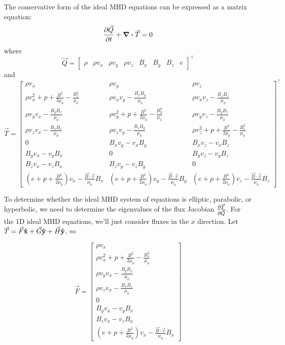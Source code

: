 \documentclass[%
 reprint,
 amsmath,amssymb,
 aps,
]{revtex4-2}
\begin{document}
The conservative form of the ideal MHD equations can be expressed as a matrix equation:
\begin{equation}
\pdv{\vec Q}{t} + \div \vec{T} = 0
\end{equation}
where
\begin{equation}
\vec Q = \begin{bmatrix}
\rho &
\rho v_x &
\rho v_y &
\rho v_z &
B_x &
B_y &
B_z &
e
\end{bmatrix}^\top
\end{equation}
and
\begin{equation}
\vec T = \begin{bmatrix}
\rho v_x & \rho v_y & \rho v_z \\
\rho v_x^2 + p + \frac{B^2}{2 \mu_0} - \frac{B_x ^2}{\mu_0} & \rho v_x v_y - \frac{B_x B_y}{\mu_0} & \rho v_x v_z - \frac{B_x B_z}{\mu_0} \\
\rho v_y v_x - \frac{B_y B_x}{\mu_0} & \rho v_y ^2 + p + \frac{B^2}{2 \mu_0} - \frac{B_y ^2}{\mu_0} & \rho v_y v_z - \frac{B_y B_z}{\mu_0} \\
\rho v_z v_x - \frac{B_x B_z}{\mu_0} & \rho v_z v_y - \frac{B_z B_y}{\mu_0} & \rho v_z ^2 + p + \frac{B^2}{2 \mu_0} - \frac{B_z ^2}{\mu_0} \\
0 & B_x v_y - v_x B_y & B_x v_z - v_x B_z  \\
B_y v_x - v_y B_x  & 0 & B_y v_z - v_y B_z  \\
B_z v_x - v_z B_x & B_z v_y - v_z B_y & 0 \\
\left( e + p + \frac{B^2}{2 \mu_0} \right) v_x - \frac{\vec B \cdot \vec v}{\mu_0} B_x & \left( e + p + \frac{B^2}{2 \mu_0} \right) v_y - \frac{\vec B \cdot \vec v}{\mu_0} B_y & \left( e + p + \frac{B^2}{2 \mu_0} \right) v_z - \frac{\vec B \cdot \vec v}{\mu_0} B_z
\end{bmatrix} ^ \top
\end{equation}

To determine whether the ideal MHD system of equations is elliptic, parabolic, or hyperbolic, we need to determine the eigenvalues of the flux Jacobian $\pdv{\vec T}{\vec Q}$. For the 1D ideal MHD equations, we'll just consider fluxes in the $x$ direction. Let $\vec T = \vec F \vu x + \vec G \vu y + \vec H \vu y$, so

\begin{equation}
\vec F = \begin{bmatrix}
\rho v_x \\
\rho v_x^2 + p + \frac{B^2}{2 \mu_0} - \frac{B_x ^2}{\mu_0} \\
\rho v_y v_x - \frac{B_y B_x}{\mu_0} \\
\rho v_z v_x - \frac{B_x B_z}{\mu_0} \\
0 \\
B_y v_x - v_y B_x \\
B_z v_x - v_z B_x \\
\left( e + p + \frac{B^2}{2 \mu_0} \right) v_x - \frac{\vec B \cdot \vec v}{\mu_0} B_x
\end{bmatrix}
\end{equation}
\end{document}
